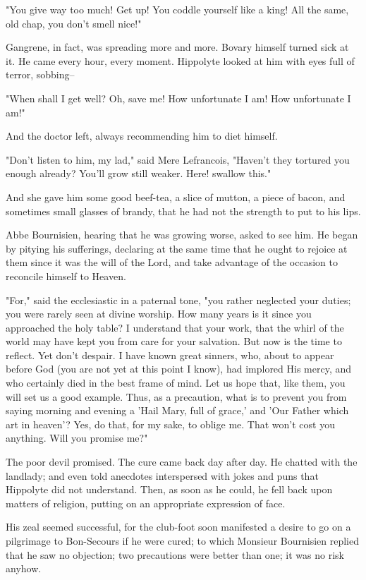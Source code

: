 \documentclass{tufte-book}
\begin{document}
"You give way too much! Get up! You coddle yourself like a king! All the
same, old chap, you don't smell nice!"

Gangrene, in fact, was spreading more and more. Bovary himself turned
sick at it. He came every hour, every moment. Hippolyte looked at him
with eyes full of terror, sobbing--

"When shall I get well? Oh, save me! How unfortunate I am! How
unfortunate I am!"

And the doctor left, always recommending him to diet himself.

"Don't listen to him, my lad," said Mere Lefrancois, "Haven't they
tortured you enough already? You'll grow still weaker. Here! swallow
this."

And she gave him some good beef-tea, a slice of mutton, a piece of
bacon, and sometimes small glasses of brandy, that he had not the
strength to put to his lips.

Abbe Bournisien, hearing that he was growing worse, asked to see him.
He began by pitying his sufferings, declaring at the same time that he
ought to rejoice at them since it was the will of the Lord, and take
advantage of the occasion to reconcile himself to Heaven.

"For," said the ecclesiastic in a paternal tone, "you rather neglected
your duties; you were rarely seen at divine worship. How many years is
it since you approached the holy table? I understand that your work,
that the whirl of the world may have kept you from care for your
salvation. But now is the time to reflect. Yet don't despair. I have
known great sinners, who, about to appear before God (you are not yet
at this point I know), had implored His mercy, and who certainly died in
the best frame of mind. Let us hope that, like them, you will set us a
good example. Thus, as a precaution, what is to prevent you from saying
morning and evening a 'Hail Mary, full of grace,' and 'Our Father which
art in heaven'? Yes, do that, for my sake, to oblige me. That won't cost
you anything. Will you promise me?"

The poor devil promised. The cure came back day after day. He chatted
with the landlady; and even told anecdotes interspersed with jokes and
puns that Hippolyte did not understand. Then, as soon as he could, he
fell back upon matters of religion, putting on an appropriate expression
of face.

His zeal seemed successful, for the club-foot soon manifested a desire
to go on a pilgrimage to Bon-Secours if he were cured; to which Monsieur
Bournisien replied that he saw no objection; two precautions were better
than one; it was no risk anyhow.
\end{document}
